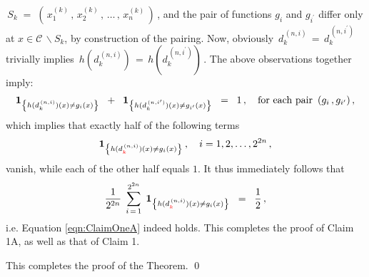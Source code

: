 \,$S_{k} \; = \; \left(\,x^{(k)}_{1}\,,\,x^{(k)}_{2}\,,\,\ldots\,,\,x^{(k)}_{n}\,\right)$\,,
and the pair of functions $g_{i}$ and $g_{i^{\prime}}$ differ only at $x \in \mathcal{C}\,\backslash S_{k}$,
by construction of the pairing.
Now, obviously \,$d^{\,(n,i)}_{k} \,=\, d^{\,(n,i^{\prime})}_{k}$\, trivially implies
\,$h(d^{\,(n,i)}_{k}) \,=\, h(d^{\,(n,i^{\prime})}_{k})$\,.
The above observations together imply:
\begin{equation*}
\mathbf{1}_{\left\{h(d^{\,(n,i)}_{k})(x) \neq g_{i}(x)\right\}}
\;\; + \;\;
	\mathbf{1}_{\left\{h(d^{\,(n,i^{\prime})}_{k})(x) \neq g_{i^{\prime}}(x)\right\}}
\;\; = \;\;
	1\,,
\quad
\textnormal{for each pair \,$(g_{i}\,, g_{i^{\prime}})$}\,,
\end{equation*}
which implies that exactly half of the following terms
\begin{equation*}
\mathbf{1}_{\left\{h(d^{\,(n,i)}_{{\color{red}k}})(x) \neq g_{i}(x)\right\}}\,,
\quad
i = 1, 2, \ldots, 2^{2n}\,,
\end{equation*}
vanish, while each of the other half equals $1$.
It thus immediately follows that
\begin{equation*}
\dfrac{1}{2^{2n}}\;\,
\overset{2^{2n}}{\underset{i\,=\,1}{\sum}}\;\,
\mathbf{1}_{\left\{h(d^{\,(n,i)}_{{\color{red}k}})(x) \neq g_{i}(x)\right\}}
\;\; = \;\;
	\dfrac{1}{2}\,,
\end{equation*}
i.e. Equation \eqref{eqn:ClaimOneA} indeed holds.
This completes the proof of Claim 1A, as well as that of Claim 1.


\vskip 5.0cm
\noindent
This completes the proof of the Theorem.
\qed



\renewcommand{\theenumi}{\roman{enumi}}
\renewcommand{\labelenumi}{\textnormal{(\theenumi)}$\;\;$}

